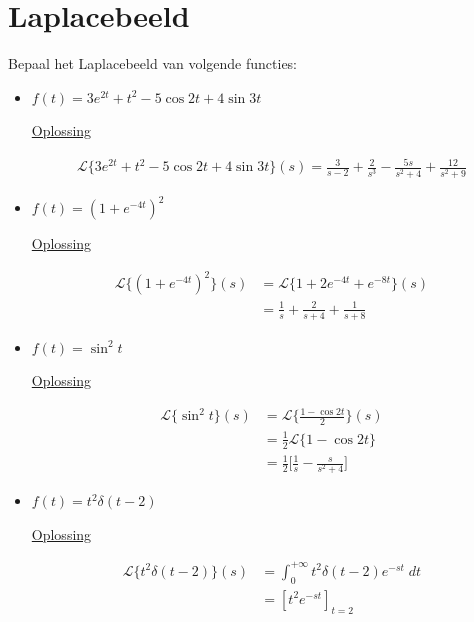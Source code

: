 \documentclass[12pt]{report}
\newcommand{\exercise}[2]{
#1


\underline{Oplossing}

#2

\hrulefill
}
\begin{document}
\section{Laplacebeeld}
Bepaal het Laplacebeeld van volgende functies:
\begin{itemize}[label={}]
 \item{
    \exercise{
        $f(t) = 3e^{2t} + t^2 - 5\cos 2t + 4\sin 3t$
    }{
        \begin{equation*}
         \begin{split}
          \mathcal{L}\{3e^{2t} + t^2 - 5\cos 2t + 4\sin 3t\}(s) = \frac{3}{s - 2} + \frac{2}{s^3} - \frac{5s}{s^2 + 4} + \frac{12}{s^2 + 9}
         \end{split}
        \end{equation*}
    }
 }
 \item{
    \exercise{
        $f(t) = (1 + e^{-4t})^2$
    }{
        \begin{equation*}
         \begin{split}
          \mathcal{L}\{(1 + e^{-4t})^2\}(s) & = \mathcal{L}\{1 + 2e^{-4t} + e^{-8t}\}(s) \\
                                            & = \frac{1}{s} + \frac{2}{s + 4} + \frac{1}{s + 8}
         \end{split}
        \end{equation*}
    }
 }
 \item{
    \exercise{
        $f(t) = \sin^2 t$
    }{
        \begin{equation*}
         \begin{split}
          \mathcal{L}\{\sin^2 t\}(s) & = \mathcal{L}\{\frac{1 - \cos 2t}{2}\}(s) \\
                                     & = \frac{1}{2}\mathcal{L}\{1 - \cos 2t\} \\
                                     & = \frac{1}{2}\bigg[\frac{1}{s} - \frac{s}{s^2 + 4}\bigg]
         \end{split}
        \end{equation*}
    }
 }
 \item{
    \exercise{
        $f(t) = t^2\delta(t - 2)$
    }{
        \begin{equation*}
         \begin{split}
          \mathcal{L}\{t^2\delta(t - 2)\}(s) & = \int_{0}^{+\infty} t^2\delta(t-2)e^{-st}\;dt \\
                                             & = [t^2e^{-st}]_{t = 2} \\

\end{split}
\end{equation*}}}
\end{itemize}
\end{document}
